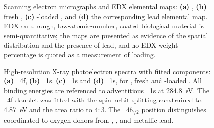 \begin{table}[htbp]
  \centering
  \caption[ATR-FTIR band assignments]{ATR-FTIR band assignments for \RAWOSS{}, \TAOSS{} and spent \TAOSS{}, with literature references for each assignment. Shifts of the carbonyl and ester features and dampening of the phenolic  band in the spent material are consistent with lead binding at the galloyl site.}
  \label{tab:ftir-bands}
\end{table}

\begin{figure}[htbp]
  \centering
  \caption[Scanning electron micrographs and EDX elemental maps]{Scanning electron micrographs and EDX elemental maps: \textbf{(a)} \RAWOSS{}, \textbf{(b)} fresh \TAOSS{}, \textbf{(c)} \PbII{}-loaded \TAOSS{}, and \textbf{(d)} the corresponding lead elemental map. EDX on a rough, low-atomic-number, coated biological material is semi-quantitative; the maps are presented as evidence of the spatial distribution and the presence of lead, and no EDX weight percentage is quoted as a measurement of loading.}
  \label{fig:sem-edx}
\end{figure}

\begin{figure}[htbp]
  \centering
  \caption[High-resolution X-ray photoelectron spectra]{High-resolution X-ray photoelectron spectra with fitted components: \textbf{(a)} ~4f, \textbf{(b)} ~1s, \textbf{(c)} ~1s and \textbf{(d)} ~1s, for \RAWOSS{}, fresh \TAOSS{} and \PbII{}-loaded \TAOSS{}. All binding energies are referenced to adventitious ~1s at \SI{284.8}{\electronvolt}. The ~4f doublet was fitted with the spin--orbit splitting constrained to \SI{4.87}{\electronvolt} and the area ratio to $4{:}3$. The ~4f$_{7/2}$ position distinguishes \PbII{} coordinated to oxygen donors from , ,  and metallic lead.}
  \label{fig:xps}
\end{figure}

